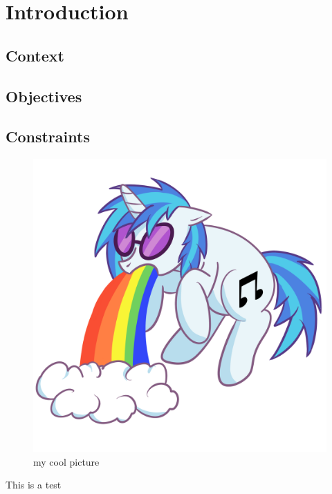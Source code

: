 \chapter{Introduction}
\label{sec:introduction}
\thispagestyle{fancy}

\lipsum[4]

\section{Context}
\lipsum[2]

\section{Objectives}
\lipsum[3]

\section{Constraints}
\lipsum[1]

\begin{figure}[h]
	\centering
	\includegraphics[scale=0.5]{includes/pictures/yourpicture.png}
	\caption{my cool picture}
	\label{my cool picture}
\end{figure}

This is a test

